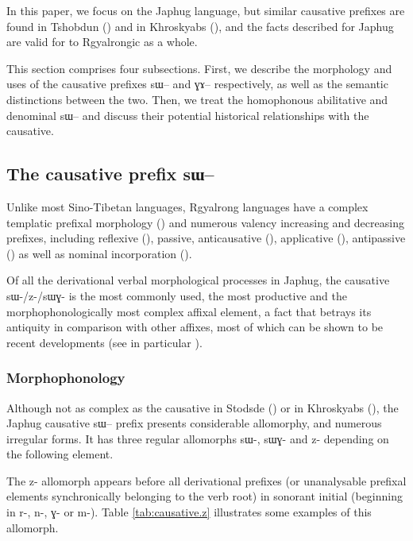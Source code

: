 \documentclass[oldfontcommands,oneside,a4paper,11pt]{article}
\newcommand{\ipa}[1]{{\phon \mbox{#1}}} %
\begin{document}
In this paper, we focus on the Japhug language, but similar causative prefixes are found in Tshobdun (\citealt{jackson06paisheng, jackson13morpho}) and in Khroskyabs (\citealt{lai13affixale,lai14caus}), and the facts described for Japhug are  valid for to Rgyalrongic as a whole.

This section comprises four subsections. First, we describe the morphology and uses of the causative prefixes \ipa{sɯ--} and \ipa{ɣɤ--} respectively, as well as the semantic distinctions between the two. Then, we treat the homophonous abilitative and denominal \ipa{sɯ--} and discuss their potential historical relationships with the causative.



\subsection{The causative prefix  \ipa{sɯ--}}

Unlike most Sino-Tibetan languages, Rgyalrong languages have a complex templatic prefixal morphology (\citealt{jacques13harmonization}) and numerous valency increasing and decreasing prefixes, including reflexive (\citealt{jacques10refl}), passive, anticausative (\citealt{jacques12demotion}), applicative (\citealt{jacques13tropative}), antipassive (\citealt{jacques14antipassive}) as well as nominal incorporation (\citealt{jacques12incorp}).

Of all the derivational verbal morphological processes in Japhug, the causative \ipa{sɯ-/z-/sɯɣ-} is the most commonly used, the most productive and the morphophonologically most complex affixal element, a fact that betrays its antiquity in comparison with other affixes, most of which can be shown to be recent developments (see in particular \citealt{jacques14antipassive}).


\subsubsection{Morphophonology} \label{subsub:caus:morphophon}
Although not as complex as the causative in Stodsde (\citealt{jackson07shangzhai}) or in Khroskyabs (\citealt{lai14caus}), the Japhug causative   \ipa{sɯ--} prefix presents  considerable allomorphy, and numerous irregular forms. It has three regular allomorphs \ipa{sɯ-}, \ipa{sɯɣ-} and \ipa{z-} depending on the following element.

The \ipa{z-} allomorph appears before all derivational prefixes (or unanalysable prefixal elements synchronically belonging to the verb root) in sonorant initial (beginning in \ipa{r-}, \ipa{n-}, \ipa{ɣ-} or \ipa{m-}). Table \ref{tab:causative.z} illustrates some examples of this allomorph.
\end{document}
